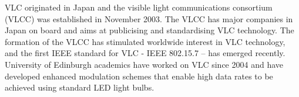 VLC originated in Japan and the visible light communications consortium (VLCC) was established in
November 2003. The VLCC has major companies in Japan on board and aims at publicising and
standardising VLC technology. The formation of the VLCC has stimulated worldwide interest in VLC
technology, and the first IEEE standard for VLC - IEEE 802.15.7 – has emerged recently. University of
Edinburgh academics have worked on VLC since 2004 and have developed enhanced modulation schemes
that enable high data rates to be achieved using standard LED light bulbs.



